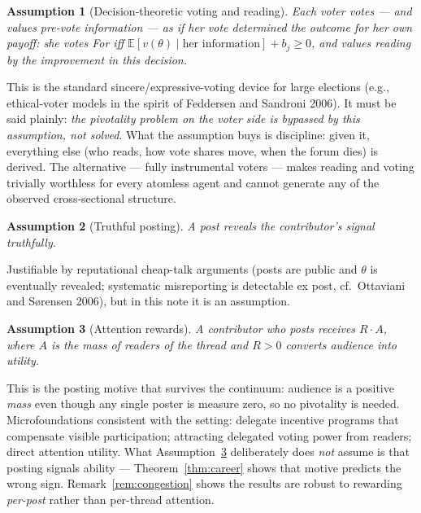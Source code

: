 \documentclass[11pt]{article}
\newtheorem{assumption}{Assumption}
\theoremstyle{remark}
\newcommand{\E}{\mathbb{E}}
\begin{document}
\begin{assumption}[Decision-theoretic voting and reading]\label{ass:sincere}
Each voter votes --- and values pre-vote information --- \emph{as if her vote
determined the outcome for her own payoff}: she votes For iff
$\E[v(\theta)\mid\text{her information}]+b_j\ge 0$, and values reading by the
improvement in this decision.
\end{assumption}

This is the standard sincere/expressive-voting device for large elections
(e.g., ethical-voter models in the spirit of Feddersen and Sandroni 2006). It
must be said plainly: \emph{the pivotality problem on the voter side is bypassed
by this assumption, not solved}. What the assumption buys is discipline: given
it, everything else (who reads, how vote shares move, when the forum dies) is
derived. The alternative --- fully instrumental voters --- makes reading and
voting trivially worthless for every atomless agent and cannot generate any of
the observed cross-sectional structure.

\begin{assumption}[Truthful posting]\label{ass:truth}
A post reveals the contributor's signal truthfully.
\end{assumption}

Justifiable by reputational cheap-talk arguments (posts are public and
$\theta$ is eventually revealed; systematic misreporting is detectable ex post,
cf.\ Ottaviani and S{\o}rensen 2006), but in this note it is an assumption.

\begin{assumption}[Attention rewards]\label{ass:attention}
A contributor who posts receives $R\cdot A$, where $A$ is the mass of readers of
the thread and $R>0$ converts audience into utility.
\end{assumption}

This is the posting motive that survives the continuum: audience is a positive
\emph{mass} even though any single poster is measure zero, so no pivotality is
needed. Microfoundations consistent with the setting: delegate incentive
programs that compensate visible participation; attracting delegated voting
power from readers; direct attention utility. What Assumption~\ref{ass:attention}
deliberately does \emph{not} assume is that posting signals ability ---
Theorem~\ref{thm:career} shows that motive predicts the wrong sign.
Remark~\ref{rem:congestion} shows the results are robust to rewarding
\emph{per-post} rather than per-thread attention.
\end{document}
